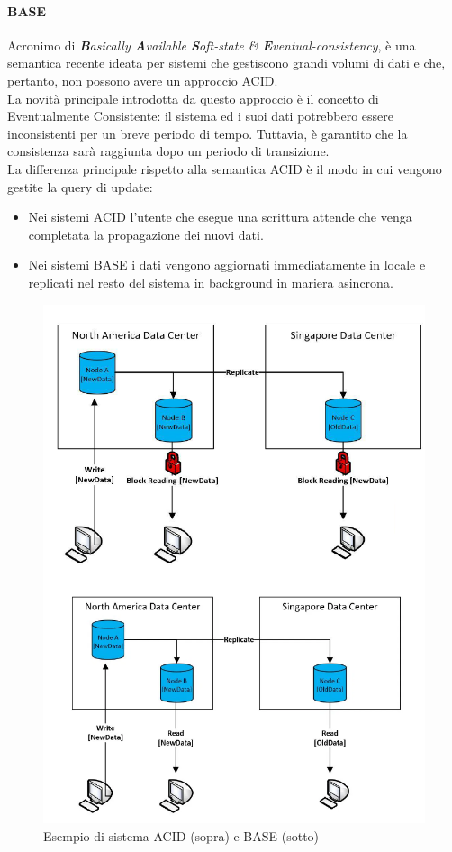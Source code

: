 \documentclass{article}
\begin{document}
\paragraph{BASE}
Acronimo di \textit{\textbf{B}asically \textbf{A}vailable \textbf{S}oft-state \& \textbf{E}ventual-consistency}, è una semantica recente ideata per sistemi che gestiscono grandi volumi di dati e che, pertanto, non possono avere un approccio ACID.\\
La novità principale introdotta da questo approccio è il concetto di Eventualmente Consistente: il sistema ed i suoi dati potrebbero essere inconsistenti per un breve periodo di tempo. Tuttavia, è garantito che la consistenza sarà raggiunta dopo un periodo di transizione.\\
La differenza principale rispetto alla semantica ACID è il modo in cui vengono gestite la query di update:
\begin{itemize}
    \item Nei sistemi ACID l'utente che esegue una scrittura attende che venga completata la propagazione dei nuovi dati.
    \item Nei sistemi BASE i dati vengono aggiornati immediatamente in locale e replicati nel resto del sistema in background in mariera asincrona.
\end{itemize}
\begin{figure}[H]
    \centering
    \includegraphics[scale=0.5]{img/acidvsbase.png}
    \caption{Esempio di sistema ACID (sopra) e BASE (sotto)}
\end{figure}\noindent
\end{document}
